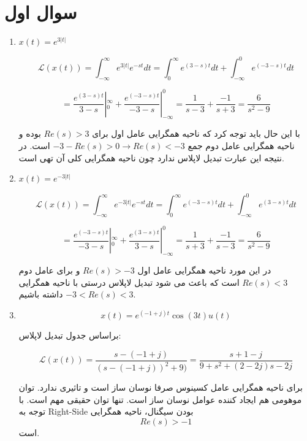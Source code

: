 \documentclass[12pt]{article}
\begin{document}
\KashidaOff

\section{سوال اول}


\begin{enumerate}[label = \Alph*)]
	
	\item
	$x(t) = e^{3 |t|}$
	
	$$\mathcal{L}(x(t)) = \int_{-\infty}^{\infty} e^{3 |t|} e^{-s t} dt = \int_{0}^{\infty} e^{(3-s)t} dt+ \int_{-\infty}^{0} e^{(-3-s)t} dt$$
	
	$$= \frac{e^{(3-s)t}}{3-s}|_{0}^{\infty} + \frac{e^{(-3-s)t}}{-3-s}|_{-\infty}^{0} = \frac{1}{s-3} + \frac{-1}{s+3} = \frac{6}{s^2 - 9}$$
	
	با این حال باید توجه کرد که ناحیه همگرایی عامل اول برای $Re(s)>3$ بوده و ناحیه همگرایی عامل دوم جمع
	$-3 - Re(s) > 0 \rightarrow Re(s)<-3$
	است. در نتیجه این عبارت تبدیل لاپلاس ندارد چون ناحیه همگرایی کلی آن تهی است.
	
	\item
	$x(t) = e^{-3 |t|}$
	
		$$\mathcal{L}(x(t)) = \int_{-\infty}^{\infty} e^{-3 |t|} e^{-s t} dt = \int_{0}^{\infty} e^{(-3-s)t} dt+ \int_{-\infty}^{0} e^{(3-s)t} dt$$
	
	$$= \frac{e^{(-3-s)t}}{-3-s}|_{0}^{\infty} + \frac{e^{(3-s)t}}{3-s}|_{-\infty}^{0} = \frac{1}{s+3} + \frac{-1}{s-3} = \frac{6}{s^2 - 9}$$
	
	در این مورد ناحیه همگرایی عامل اول
	 $Re(s) >-3$
	 و برای عامل دوم
	 $Re(s)<3$
	 است که باعث می شود تبدیل لاپلاس درستی با ناحیه همگرایی
	 $-3 < Re(s) < 3$
	 داشته باشیم.
	 
	 
	 
	 \item
	 $$x(t) =e^{(-1 + j) t} \cos(3t) u(t)$$
	
	
	براساس جدول تبدیل لاپلاس:
	
	$$\mathcal{L}(x(t)) = \frac{s - (-1 +j)}{(s - (-1 +j))^2 + 9)} = \frac{s +1 - j}{9 + s^2 + (2-2j)s - 2j}$$
	
	برای ناحیه همگرایی عامل کسینوس صرفا نوسان ساز است و تاثیری ندارد. توان موهومی هم ایجاد کننده عوامل نوسان ساز است. تنها توان حقیقی مهم است. با توجه به Right-Side بودن سیگنال، ناحیه همگرایی
	$$Re(s)>-1$$
	است.
	
	
	
\end{enumerate}
\end{document}
